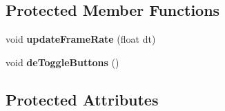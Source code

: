 \subsection*{Protected Member Functions}
\begin{DoxyCompactItemize}
\item 
\hypertarget{class_v_r_builder_app_a3509900bfeff561562680b4e4f6049db}{
void {\bfseries updateFrameRate} (float dt)}
\label{class_v_r_builder_app_a3509900bfeff561562680b4e4f6049db}

\item 
\hypertarget{class_v_r_builder_app_ae239d3f22072bb352450c1f581e3c509}{
void {\bfseries deToggleButtons} ()}
\label{class_v_r_builder_app_ae239d3f22072bb352450c1f581e3c509}

\end{DoxyCompactItemize}
\subsection*{Protected Attributes}
